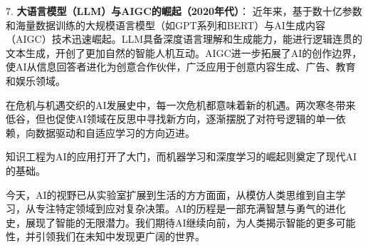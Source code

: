 7. {\bf 大语言模型（LLM）与{\bf AIGC}的崛起（2020年代）}：
近年来，基于数十亿参数和海量数据训练的大规模语言模型（如GPT系列和BERT）与AI生成内容（AIGC）技术迅速崛起。LLM具备深度语言理解和生成能力，能进行逻辑连贯的文本生成，开创了更加自然的智能人机互动。AIGC进一步拓展了AI的创作边界，使AI从信息回答者进化为创意合作伙伴，广泛应用于创意内容生成、广告、教育和娱乐领域。

在危机与机遇交织的AI发展史中，每一次危机都意味着新的机遇。两次寒冬带来低谷，但也促使AI领域在反思中寻找新方向，逐渐摆脱了对符号逻辑的单一依赖，向数据驱动和自适应学习的方向迈进。

知识工程为AI的应用打开了大门，而机器学习和深度学习的崛起则奠定了现代AI的基础。

今天，AI的视野已从实验室扩展到生活的方方面面，从模仿人类思维到自主学习，从专注特定领域到应对复杂决策。AI的历程是一部充满智慧与勇气的进化史，展现了智能的无限潜力。我们期待AI继续向前，为人类揭示智能的更多可能性，并引领我们在未知中发现更广阔的世界。




\nocite{*}
\printbibliography[heading=bibintoc, title=\ebibname]
\appendix


\newpage


